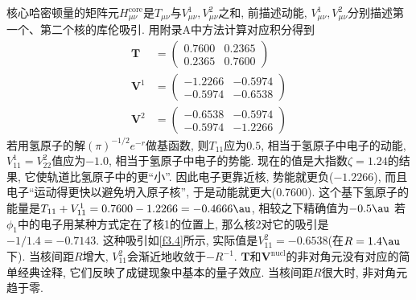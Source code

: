 
核心哈密顿量的矩阵元$H_{\mu\nu}^\mathrm{core}$是$T_{\mu\nu}$与$V_{\mu\nu}^1,V_{\mu\nu}^2$之和, 
前描述动能, 
$V_{\mu\nu}^1,V_{\mu\nu}^2$分别描述第一个、第二个核的库伦吸引. 
用附录A中方法计算对应积分得到
\begin{align}
	\mathbf{T} & = 
	\begin{pmatrix}
		0.7600&0.2365\\0.2365&0.7600
	\end{pmatrix}\\
	\mathbf{V}^1 & = 
	\begin{pmatrix}
		-1.2266&-0.5974\\-0.5974&-0.6538
	\end{pmatrix}\\
	\mathbf{V}^2 & = 
	\begin{pmatrix}
		-0.6538&-0.5974\\-0.5974&-1.2266
	\end{pmatrix}
\end{align}
若用氢原子的解$(\pi)^{-1/2}e^{-r}$做基函数, 
则$T_{11}$应为$0.5$, 
相当于氢原子中电子的动能, 
$V_{11}^1=V_{22}^2$值应为$-1.0$, 
相当于氢原子中电子的势能. 
现在的值是大指数$\zeta=1.24$的结果, 
它使轨道比氢原子中的更``小''. 
因此电子更靠近核, 
势能就更负($-1.2266$), 
而且电子``运动得更快以避免坍入原子核'', 
于是动能就更大($0.7600$). 
这个基下氢原子的能量是$T_{11}+V_{11}^1=0.7600-1.2266=-0.4666\au$,
相较之下精确值为$-0.5\au$
若$\phi_1$中的电子用某种方式定在了核1的位置上, 
那么核2对它的吸引是$-1/1.4=-0.7143$. 
这种吸引如\autoref{f3.4}所示, 
实际值是$V_{11}^2=-0.6538$(在$R=1.4\au$下). 
当核间距$R$增大, 
$V_{11}^2$会渐近地收敛于$-R^{-1}$. 
$\mathbf{T}$和$\mathbf{V}^\mathrm{nucl}$的非对角元没有对应的简单经典诠释, 
它们反映了成键现象中基本的量子效应. 
当核间距$R$很大时, 
非对角元趋于零.


